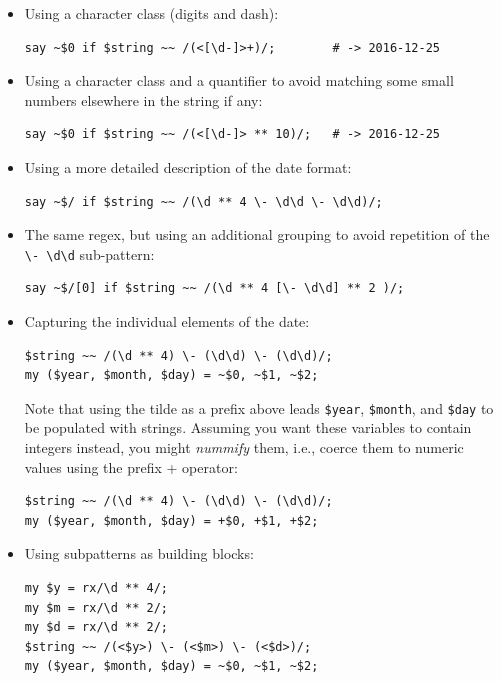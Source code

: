 \begin{itemize}

\item Using a character class (digits and dash):

\begin{verbatim}
say ~$0 if $string ~~ /(<[\d-]>+)/;        # -> 2016-12-25
\end{verbatim}
%

\item Using a character class and a quantifier to avoid 
matching some small numbers elsewhere in the string if any:

\begin{verbatim}
say ~$0 if $string ~~ /(<[\d-]> ** 10)/;   # -> 2016-12-25
\end{verbatim}
%

\item Using a more detailed description of the date format:
\begin{verbatim}
say ~$/ if $string ~~ /(\d ** 4 \- \d\d \- \d\d)/;
\end{verbatim}
%

\item The same regex, but using an additional grouping to avoid 
repetition of the \verb'\- \d\d' sub-pattern: 

\begin{verbatim}
say ~$/[0] if $string ~~ /(\d ** 4 [\- \d\d] ** 2 )/; 
\end{verbatim}
%

\item Capturing the individual elements of the date:
\begin{verbatim}
$string ~~ /(\d ** 4) \- (\d\d) \- (\d\d)/;
my ($year, $month, $day) = ~$0, ~$1, ~$2;
\end{verbatim}
%
Note that using the tilde as a prefix above leads 
\verb'$year', \verb'$month', and \verb'$day' to be 
populated with strings. Assuming you want these variables 
to contain integers instead, you might \emph{nummify} them, i.e., 
coerce them to numeric values using the prefix + operator:
\begin{verbatim}
$string ~~ /(\d ** 4) \- (\d\d) \- (\d\d)/;
my ($year, $month, $day) = +$0, +$1, +$2;
\end{verbatim}
%
 

\item Using subpatterns as building blocks:
\begin{verbatim}
my $y = rx/\d ** 4/;
my $m = rx/\d ** 2/;
my $d = rx/\d ** 2/;
$string ~~ /(<$y>) \- (<$m>) \- (<$d>)/;
my ($year, $month, $day) = ~$0, ~$1, ~$2;
\end{verbatim}
%


\end{itemize}
